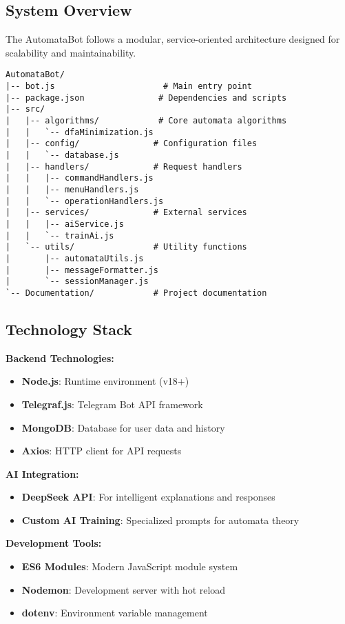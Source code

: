 \documentclass[12pt]{article}
\begin{document}
\subsection{System Overview}
The AutomataBot follows a modular, service-oriented architecture designed for scalability and maintainability.
\begin{lstlisting}
AutomataBot/
|-- bot.js                      # Main entry point
|-- package.json               # Dependencies and scripts
|-- src/
|   |-- algorithms/            # Core automata algorithms
|   |   `-- dfaMinimization.js
|   |-- config/               # Configuration files
|   |   `-- database.js
|   |-- handlers/             # Request handlers
|   |   |-- commandHandlers.js
|   |   |-- menuHandlers.js
|   |   `-- operationHandlers.js
|   |-- services/             # External services
|   |   |-- aiService.js
|   |   `-- trainAi.js
|   `-- utils/                # Utility functions
|       |-- automataUtils.js
|       |-- messageFormatter.js
|       `-- sessionManager.js
`-- Documentation/            # Project documentation
\end{lstlisting}

\subsection{Technology Stack}
\textbf{Backend Technologies:}
\begin{itemize}
    \item \textbf{Node.js}: Runtime environment (v18+)
    \item \textbf{Telegraf.js}: Telegram Bot API framework
    \item \textbf{MongoDB}: Database for user data and history
    \item \textbf{Axios}: HTTP client for API requests
\end{itemize}
\textbf{AI Integration:}
\begin{itemize}
    \item \textbf{DeepSeek API}: For intelligent explanations and responses
    \item \textbf{Custom AI Training}: Specialized prompts for automata theory
\end{itemize}
\textbf{Development Tools:}
\begin{itemize}
    \item \textbf{ES6 Modules}: Modern JavaScript module system
    \item \textbf{Nodemon}: Development server with hot reload
    \item \textbf{dotenv}: Environment variable management
\end{itemize}
\end{document}
